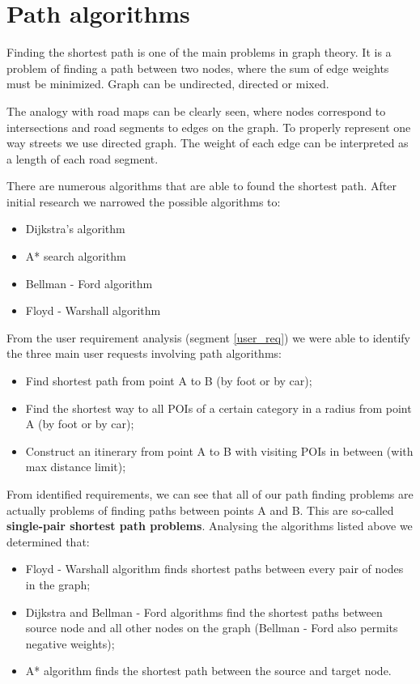 
\chapter{Path algorithms} %

\label{Chapter6} %


Finding the shortest path is one of the main problems in graph theory. It is a problem of finding a path between two nodes, where the sum of edge weights must be minimized. Graph can be undirected, directed or mixed.
\par The analogy with road maps can be clearly seen, where nodes correspond to intersections and road segments to edges on the graph. To properly represent one way streets we use directed graph. The weight of each edge can be interpreted as a length of each road segment.
\par There are numerous algorithms that are able to found the shortest path. After initial research we narrowed the possible algorithms to:
\begin{itemize}
\item Dijkstra's algorithm
\item A* search algorithm
\item Bellman - Ford algorithm
\item Floyd - Warshall algorithm
\end{itemize}
From the user requirement analysis (segment \ref{user_req}) we were able to identify the three main user requests involving path algorithms:
\begin{itemize}
\item Find shortest path from point A to B (by foot or by car);
\item Find the shortest way to all POIs of a certain category in a radius from point A (by foot or by car);
\item Construct an itinerary from point A to B with visiting POIs in between (with max distance limit);
\end{itemize}

From identified requirements, we can see that all of our path finding problems are actually problems of finding paths between points A and B. This are so-called \textbf{single-pair shortest path problems}. Analysing the algorithms listed above we determined that:
\begin{itemize}
\item Floyd - Warshall algorithm finds shortest paths between every pair of nodes in the graph;
\item Dijkstra and Bellman - Ford algorithms find the shortest paths between source node and all other nodes on the graph (Bellman - Ford also permits negative weights);
\item A* algorithm finds the shortest path between the source and target node. 
\end{itemize}

